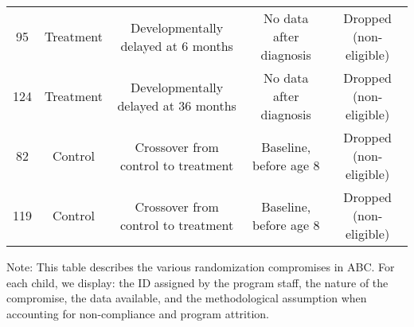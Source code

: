 \begin{sidewaystable}[H]
\begin{threeparttable}
\begin{tabular}{ccccc}
95   & Treatment       & Developmentally delayed at 6 months & No data after diagnosis & Dropped (non-eligible) \\ 
124 & Treatment       & Developmentally delayed at 36 months & No data after diagnosis & Dropped (non-eligible) \\ \midrule
 82 & Control       & Crossover from control to treatment & Baseline, before age 8 & Dropped (non-eligible)  \\ 
 119 & Control       & Crossover from control to treatment & Baseline, before age 8 & Dropped (non-eligible)  \\ \bottomrule
\end{tabular}
\begin{tablenotes}
\item Note: This table describes the various randomization compromises in ABC. For each child, we display: the ID assigned by the program staff, the nature of the compromise, the data available, and the methodological assumption when accounting for non-compliance and program attrition. 
\end{tablenotes}
\end{threeparttable}
\end{sidewaystable}